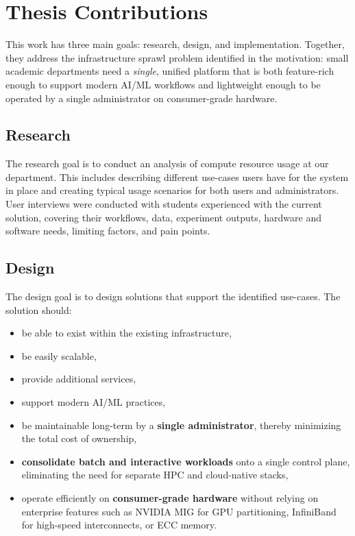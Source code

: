 \section{Thesis Contributions}

This work has three main goals: research, design, and implementation. Together, they address the infrastructure sprawl problem identified in the motivation: small academic departments need a \emph{single}, unified platform that is both feature-rich enough to support modern AI/ML workflows and lightweight enough to be operated by a single administrator on consumer-grade hardware.

\subsection{Research}

The research goal is to conduct an analysis of compute resource usage at our department. This includes describing different use-cases users have for the system in place and creating typical usage scenarios for both users and administrators. User interviews were conducted with students experienced with the current solution, covering their workflows, data, experiment outputs, hardware and software needs, limiting factors, and pain points.


\subsection{Design}

The design goal is to design solutions that support the identified use-cases. The solution should:
\begin{itemize}
    \item be able to exist within the existing infrastructure,
    \item be easily scalable,
    \item provide additional services,
    \item support modern AI/ML practices,
    \item be maintainable long-term by a \textbf{single administrator}, thereby minimizing the total cost of ownership,
    \item \textbf{consolidate batch and interactive workloads} onto a single control plane, eliminating the need for separate HPC and cloud-native stacks,
    \item operate efficiently on \textbf{consumer-grade hardware} without relying on enterprise features such as NVIDIA MIG for GPU partitioning, InfiniBand for high-speed interconnects, or ECC memory.
\end{itemize}

